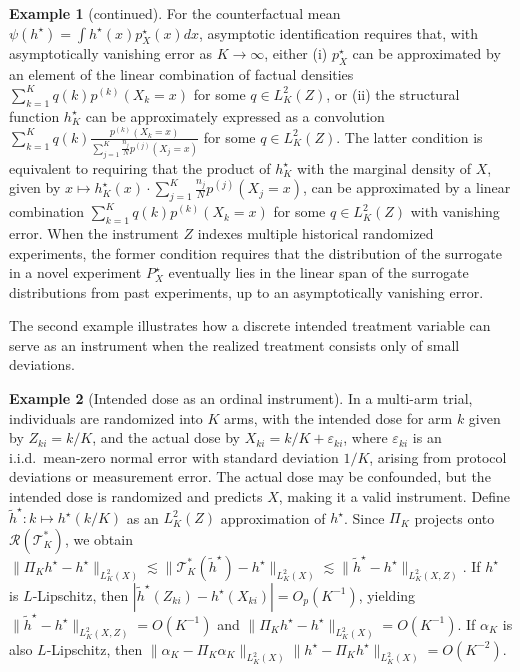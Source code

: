 \documentclass[11pt]{article}
\theoremstyle{plain}
\theoremstyle{definition}
\newtheorem{example}{Example}
\theoremstyle{remark}
\theoremstyle{definition}
\begin{document}
 \setcounter{example}{0}
\begin{example}[continued]
For the counterfactual mean \( \psi(h^\star) = \int h^\star(x) p_X^\star(x)dx \), asymptotic identification requires that, with asymptotically vanishing error as $K \rightarrow \infty$, either (i) \( p_X^\star \) can be approximated by an element of the linear combination of factual densities \( \sum_{k=1}^K  q(k)p^{(k)}(X_k = x)\) for some \(q \in L^2_K(Z)  \), or (ii) the structural function \( h_K^{\star} \) can be approximately expressed as a convolution  $\sum_{k=1}^K q(k) \frac{p^{(k)}(X_k = x)}{\sum_{j=1}^K \frac{n_{j}}{N} p^{(j)}(X_{j} = x)}$ for some $q \in L^2_K(Z)$. The latter condition is equivalent to requiring that the product of $h_K^{\star}$ with the marginal density of $X$, given by $x \mapsto h_K^{\star}(x) \cdot \sum_{j=1}^K \frac{n_{j}}{N} p^{(j)}(X_{j} = x)$, can be approximated by a linear combination \( \sum_{k=1}^K q(k)p^{(k)}(X_k = x) \) for some \( q \in L^2_K(Z) \) with vanishing error. When the instrument \( Z \) indexes multiple historical randomized experiments, the former condition requires that the distribution of the surrogate in a novel experiment \( P_X^\star \) eventually lies in the linear span of the surrogate distributions from past experiments, up to an asymptotically vanishing error. 
\end{example}




The second example illustrates how a discrete intended treatment variable can serve as an instrument when the realized treatment consists only of small deviations.

 \setcounter{example}{2}
\begin{example}[Intended dose as an ordinal instrument]
In a multi-arm trial, individuals are randomized into \( K \) arms, with the intended dose for arm \( k \) given by \( Z_{ki} = k/K \), and the actual dose by \( X_{ki} = k/K + \varepsilon_{ki} \), where \( \varepsilon_{ki} \) is an i.i.d.\ mean-zero normal error with standard deviation \( 1/K \), arising from protocol deviations or measurement error. The actual dose may be confounded, but the intended dose is randomized and predicts $X$, making it a valid instrument. Define $\widetilde{h}^{\star}: k \mapsto h^\star(k/K)$ as an $L^2_K(Z)$ approximation of $h^\star$. Since $\Pi_K$ projects onto $\mathcal{R}(\mathcal{T}_K^*)$, we obtain $\|\Pi_K h^\star - h^\star\|_{L^2_K(X)} \lesssim \|\mathcal{T}_K^*(\widetilde{h}^{\star}) - h^\star\|_{L^2_K(X)} \lesssim \|\widetilde{h}^{\star} -  h^\star\|_{L^2_K(X,Z)}.$
If $h^\star$ is $L$-Lipschitz, then $|\widetilde{h}^{\star}(Z_{ki}) - h^\star(X_{ki})| = O_p(K^{-1})$, yielding $\|\widetilde{h}^{\star} -  h^\star\|_{L^2_K(X,Z)} = O(K^{-1})$ and $\|\Pi_K h^\star - h^\star\|_{L^2_K(X)} = O(K^{-1})$. If $\alpha_K$ is also $L$-Lipschitz, then $
\| \alpha_K - \Pi_{K} \alpha_K \|_{L^2_K(X)} \| h^\star  - \Pi_{K} h^\star\|_{L^2_K(X)} = O(K^{-2}).$ 
\end{example}
 
\end{document}
